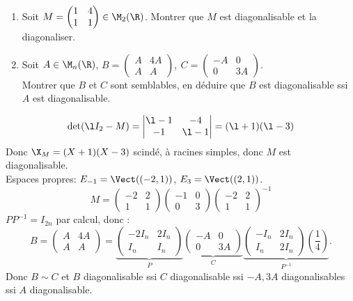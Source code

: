 \documentclass[11pt]{article}
\begin{document}
\begin{exercice}{}{}
    \begin{enumerate}
        \item Soit $M=\begin{pmatrix}1&4\\1&1\end{pmatrix}\in\M_2(\R)$. Montrer que $M$ est diagonalisable et la diagonaliser.
        \item Soit $A\in\M_n(\R)$, $B=\begin{pmatrix}A&4A\\A&A\end{pmatrix}, ~ C=\begin{pmatrix}-A&0\\0&3A\end{pmatrix}$.\\
        Montrer que $B$ et $C$ sont semblables, en déduire que $B$ est diagonalisable ssi $A$ est diagonalisable.
    \end{enumerate}
    \tcblower
    \begin{equation*}
        \det(\l I_2 - M) = \begin{vmatrix} \l - 1 & -4 \\ -1 & \l - 1 \end{vmatrix}  = (\l + 1)(\l - 3)
    \end{equation*}
    Donc $\X_M = (X+1)(X-3)$ scindé, à racines simples, donc $M$ est diagonalisable.\\
    Espaces propres:  $E_{-1}=\Vect((-2,1))$, $E_{3}=\Vect((2,1))$.
    \begin{equation*}
        M=\begin{pmatrix}-2&2\\1&1\end{pmatrix}\begin{pmatrix}-1&0\\0&3\end{pmatrix}\begin{pmatrix}-2&2\\1&1\end{pmatrix}^{-1}
    \end{equation*}
     $PP^{-1}=I_{2n}$ par calcul, donc :
    \begin{equation*}
        B = \begin{pmatrix}A & 4A \\ A & A\end{pmatrix} = \underbrace{\begin{pmatrix}-2I_n & 2I_n \\ I_n & I_n\end{pmatrix}}_{P}\underbrace{\begin{pmatrix}-A&0\\0&3A\end{pmatrix}}_{C}\underbrace{\begin{pmatrix}-I_n&2I_n\\I_n&2I_n\end{pmatrix}\left( \frac{1}{4} \right)}_{P^{-1}}.
    \end{equation*}
    Donc $B\sim C$ et $B$ diagonalisable ssi $C$ diagonalisable ssi $-A,3A$ diagonalisables ssi $A$ diagonalisable.
\end{exercice}
\end{document}
